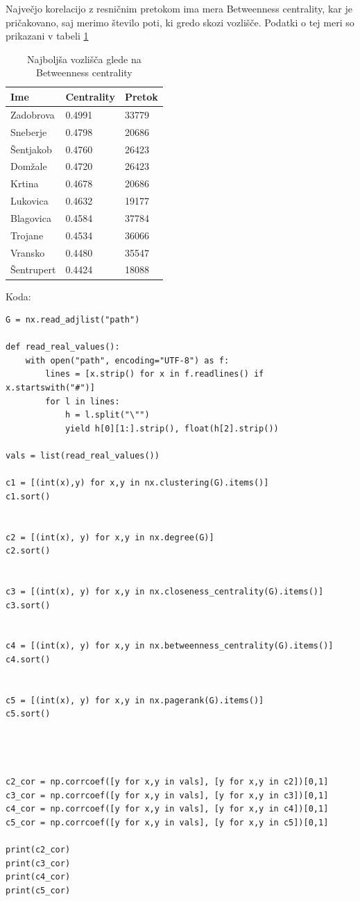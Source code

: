 \documentclass[a4paper,11pt]{article}
\begin{document}
Največjo korelacijo z resničnim pretokom ima mera Betweenness centrality, kar je pričakovano, saj merimo število poti, ki gredo skozi vozlišče. Podatki o tej meri so prikazani v tabeli \ref{bc}

\begin{table}[]
\centering
\caption{Najboljša vozlišča glede na Betweenness centrality}
\label{bc}
\begin{tabular}{|l|l|l|}
\hline
Ime & Centrality & Pretok   \\ \hline
Zadobrova& 0.4991 &   33779 \\ \hline
Sneberje & 0.4798 &  20686  \\ \hline
Šentjakob & 0.4760 &  26423  \\ \hline
Domžale & 0.4720 &  26423  \\ \hline
Krtina & 0.4678 &  20686  \\ \hline
Lukovica & 0.4632 &  19177  \\ \hline
Blagovica & 0.4584 &  37784  \\ \hline
Trojane & 0.4534 &  36066  \\ \hline
Vransko & 0.4480 &  35547  \\ \hline
Šentrupert & 0.4424 &  18088  \\ \hline
\end{tabular}
\end{table}

\begin{minipage}{\linewidth}

Koda:

\begin{lstlisting}
G = nx.read_adjlist("path")

def read_real_values():
    with open("path", encoding="UTF-8") as f:
        lines = [x.strip() for x in f.readlines() if x.startswith("#")]
        for l in lines:
            h = l.split("\"")
            yield h[0][1:].strip(), float(h[2].strip())

vals = list(read_real_values())

c1 = [(int(x),y) for x,y in nx.clustering(G).items()]
c1.sort()


c2 = [(int(x), y) for x,y in nx.degree(G)]
c2.sort()


c3 = [(int(x), y) for x,y in nx.closeness_centrality(G).items()]
c3.sort()


c4 = [(int(x), y) for x,y in nx.betweenness_centrality(G).items()]
c4.sort()


c5 = [(int(x), y) for x,y in nx.pagerank(G).items()]
c5.sort()




c2_cor = np.corrcoef([y for x,y in vals], [y for x,y in c2])[0,1]
c3_cor = np.corrcoef([y for x,y in vals], [y for x,y in c3])[0,1]
c4_cor = np.corrcoef([y for x,y in vals], [y for x,y in c4])[0,1]
c5_cor = np.corrcoef([y for x,y in vals], [y for x,y in c5])[0,1]

print(c2_cor)
print(c3_cor)
print(c4_cor)
print(c5_cor)
\end{lstlisting}
\end{minipage}
\end{document}
